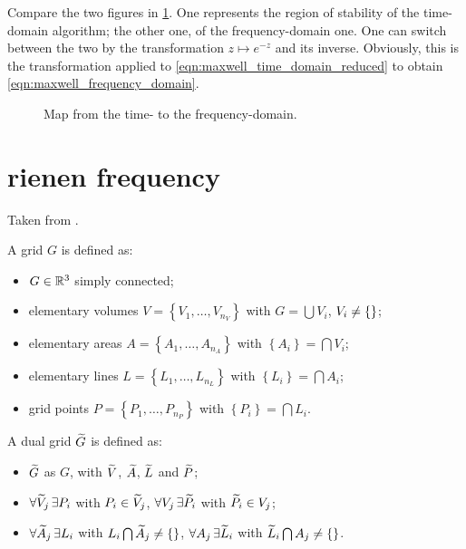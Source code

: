 Compare the two figures in \ref{fig:stability_td_vs_fd}. One
represents the region of stability of the time-domain algorithm; the
other one, of the frequency-domain one. One can switch between the two
by the transformation $z \mapsto e^{-z}$ and its inverse. Obviously,
this is the transformation applied to
\eqref{eqn:maxwell_time_domain_reduced} to obtain
\eqref{eqn:maxwell_frequency_domain}.

\begin{figure}[htbp]
  \begin{center}
    \resizebox{10cm}{!}{}
  \end{center}
  \caption{Map from the time- to the frequency-domain.}
  \label{fig:stability_td_vs_fd}
\end{figure}

\section{rienen frequency}

Taken from \cite{rienen_frequency}.

\begin{definition}
  A grid $G$ is defined as:
  \begin{itemize}

  \item
    $G \in \mathbb{R}^3$ simply connected;
  \item
    elementary volumes $V = \left\{ V_1, \dotsc, V_{n_V} \right\}$ with
    $G = \bigcup V_i$, $V_i \neq \left\{ \right\}$;
  \item
    elementary areas $A = \left\{ A_1, \dotsc, A_{n_A} \right\}$ with
    $\left\{ A_i \right\} = \bigcap V_i$;
  \item
    elementary lines $L = \left\{ L_1, \dotsc, L_{n_L} \right\}$ with
    $\left\{ L_i \right\} = \bigcap A_i$;
  \item
    grid points $P = \left\{ P_1, \dotsc, P_{n_P} \right\}$ with
    $\left\{ P_i \right\} = \bigcap L_i$.
  \end{itemize}
\end{definition}

\begin{definition}
  A dual grid $\widetilde{G}$ is defined as:
  \begin{itemize}
  \item
    $\widetilde{G}$ as $G$, with $\widetilde{V}$, $\widetilde{A}$, $\widetilde{L}$ and
    $\widetilde{P}$;
  \item
    $\forall \widetilde{V}_j \, \exists P_i$ with $P_i \in \widetilde{V}_j$, $\forall
    V_j \, \exists \widetilde{P}_i$ with $\widetilde{P}_i \in V_j$;
  \item
    $\forall \widetilde{A}_j \, \exists L_i$ with $L_i \bigcap \widetilde{A}_j \neq
    \left\{ \right\}$, $\forall A_j \, \exists \widetilde{L}_i$ with $\widetilde{L}_i
    \bigcap A_j \neq \left\{ \right\}$.
  \end{itemize}
\end{definition}


